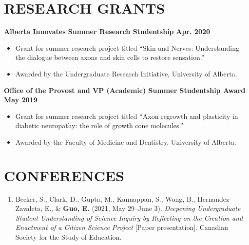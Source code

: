\documentclass{article}
\begin{document}
\section*{\textcolor{my_colour}{RESEARCH GRANTS}}
\vspace{-.25em} \hrulefill \vspace{.75em}

    \textbf{Alberta Innovates Summer Research Studentship} \hfill \textbf{Apr. 2020}
    \begin{itemize}
        \item Grant for summer research project titled ``Skin and Nerves: Understanding the dialogue between axons and skin cells to restore sensation.''
        \item Awarded by the Undergraduate Research Initiative, University of Alberta.
    \end{itemize}
    \textbf{Office of the Provost and VP (Academic) Summer Studentship Award} \hfill \textbf{May 2019}
        \begin{itemize}
            \item Grant for summer research project titled ``Axon regrowth and plasticity in diabetic neuropathy: the role of growth cone molecules.''
            \item Awarded by the Faculty of Medicine and Dentistry, University of Alberta.
        \end{itemize}


\section*{\textcolor{my_colour}{CONFERENCES}}
\vspace{-.25em} \hrulefill \vspace{.75em}
\vspace{-.5em}
\begin{enumerate}[leftmargin=!, itemindent=-.55cm]
    \item Becker, S., Clark, D., Gupta, M., Kannappan, S., Wong, B., Hernandez-Zavaleta, E., \& \textbf{Guo, E.} (2021, May 29--June 3). \textit{Deepening Undergraduate Student Understanding of Science Inquiry by Reflecting on the Creation and Enactment of a Citizen Science Project} [Paper presentation]. Canadian Society for the Study of Education.
\end{enumerate}
\end{document}
